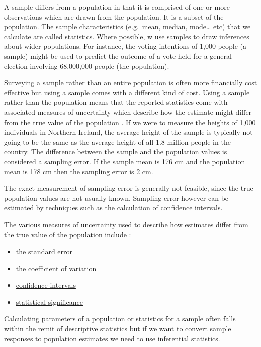 \documentclass[
]{book}
\begin{document}
A sample differs from a population in that it is comprised of one or more observations which are drawn from the population. It is a subset of the population. The sample characteristics (e.g.~mean, median, mode\ldots{} etc) that we calculate are called statistics. Where possible, w use samples to draw inferences about wider populations. For instance, the voting intentions of 1,000 people (a sample) might be used to predict the outcome of a vote held for a general election involving 68,000,000 people (the population).

Surveying a sample rather than an entire population is often more financially cost effective but using a sample comes with a different kind of cost. Using a sample rather than the population means that the reported statistics come with associated measures of uncertainty which describe how the estimate might differ from the true value of the population \citep{uncertainty}. If we were to measure the heights of 1,000 individuals in Northern Ireland, the average height of the sample is typically not going to be the same as the average height of all 1.8 million people in the country. The difference between the sample and the population values is considered a sampling error. If the sample mean is 176 cm and the population mean is 178 cm then the sampling error is 2 cm.

The exact measurement of sampling error is generally not feasible, since the true population values are not usually known. Sampling error however can be estimated by techniques such as the calculation of confidence intervals.

The various measures of uncertainty used to describe how estimates differ from the true value of the population include \citep{uncertainty}:

\begin{itemize}
\item
  the \protect\hyperlink{stderr}{standard error}
\item
  the \protect\hyperlink{coeff}{coefficient of variation}
\item
  \protect\hyperlink{confint}{confidence intervals}
\item
  \protect\hyperlink{signif}{statistical significance}
\end{itemize}

Calculating parameters of a population or statistics for a sample often falls within the remit of descriptive statistics but if we want to convert sample responses to population estimates we need to use inferential statistics.
\end{document}
